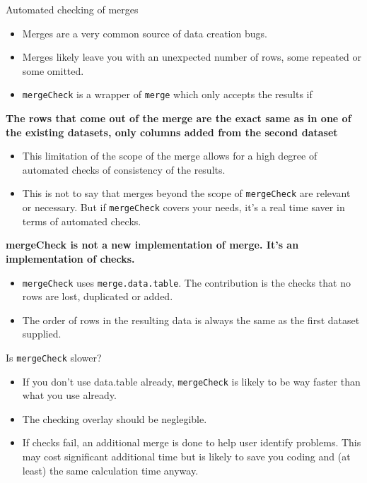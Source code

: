 \documentclass[
  8pt,
  ignorenonframetext,
  aspectratio=169]{beamer}
\providecommand{\tightlist}{%
  \setlength{\itemsep}{0pt}\setlength{\parskip}{0pt}}
\begin{document}
\begin{frame}[fragile]{Automated checking of merges}
\protect\hypertarget{automated-checking-of-merges}{}
\begin{itemize}
\tightlist
\item
  Merges are a very common source of data creation bugs.
\item
  Merges likely leave you with an unexpected number of rows, some
  repeated or some omitted.
\item
  \texttt{mergeCheck} is a wrapper of \texttt{merge} which only accepts
  the results if
\end{itemize}

\textbf{The rows that come out of the merge are the exact same as in one
of the existing datasets, only columns added from the second dataset}

\begin{itemize}
\item
  This limitation of the scope of the merge allows for a high degree of
  automated checks of consistency of the results.
\item
  This is not to say that merges beyond the scope of \texttt{mergeCheck}
  are relevant or necessary. But if \texttt{mergeCheck} covers your
  needs, it's a real time saver in terms of automated checks.
\end{itemize}

\textbf{mergeCheck is not a new implementation of merge. It's an
implementation of checks.}

\begin{itemize}
\item
  \texttt{mergeCheck} uses \texttt{merge.data.table}. The contribution
  is the checks that no rows are lost, duplicated or added.
\item
  The order of rows in the resulting data is always the same as the
  first dataset supplied.
\end{itemize}

Is \texttt{mergeCheck} slower?

\begin{itemize}
\tightlist
\item
  If you don't use data.table already, \texttt{mergeCheck} is likely to
  be way faster than what you use already.
\item
  The checking overlay should be neglegible.
\item
  If checks fail, an additional merge is done to help user identify
  problems. This may cost significant additional time but is likely to
  save you coding and (at least) the same calculation time anyway.
\end{itemize}
\end{frame}
\end{document}
